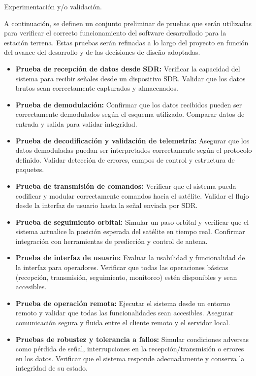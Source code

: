 
Experimentación y/o validación.

A continuación, se definen un conjunto preliminar de pruebas que serán utilizadas para verificar el correcto funcionamiento del software desarrollado para la estación terrena. Estas pruebas serán refinadas a lo largo del proyecto en función del avance del desarrollo y de las decisiones de diseño adoptadas.

\begin{itemize}
    \item \textbf{Prueba de recepción de datos desde SDR:} Verificar la capacidad del sistema para recibir señales desde un dispositivo SDR. Validar que los datos brutos sean correctamente capturados y almacenados.

    \item \textbf{Prueba de demodulación:} Confirmar que los datos recibidos pueden ser correctamente demodulados según el esquema utilizado. Comparar datos de entrada y salida para validar integridad.

    \item \textbf{Prueba de decodificación y validación de telemetría:} Asegurar que los datos demoduladas puedan ser interpretados correctamente según el protocolo definido. Validar detección de errores, campos de control y estructura de paquetes.

    \item \textbf{Prueba de transmisión de comandos:} Verificar que el sistema pueda codificar y modular correctamente comandos hacia el satélite. Validar el flujo desde la interfaz de usuario hasta la señal enviada por SDR.

    \item \textbf{Prueba de seguimiento orbital:} Simular un paso orbital y verificar que el sistema actualice la posición esperada del satélite en tiempo real. Confirmar integración con herramientas de predicción y control de antena.

    \item \textbf{Prueba de interfaz de usuario:} Evaluar la usabilidad y funcionalidad de la interfaz para operadores. Verificar que todas las operaciones básicas (recepción, transmisión, seguimiento, monitoreo) estén disponibles y sean accesibles.

    \item \textbf{Prueba de operación remota:} Ejecutar el sistema desde un entorno remoto y validar que todas las funcionalidades sean accesibles. Asegurar comunicación segura y fluida entre el cliente remoto y el servidor local.

    \item \textbf{Pruebas de robustez y tolerancia a fallos:} Simular condiciones adversas como pérdida de señal, interrupciones en la recepción/transmisión o errores en los datos. Verificar que el sistema responde adecuadamente y conserva la integridad de su estado.
\end{itemize}